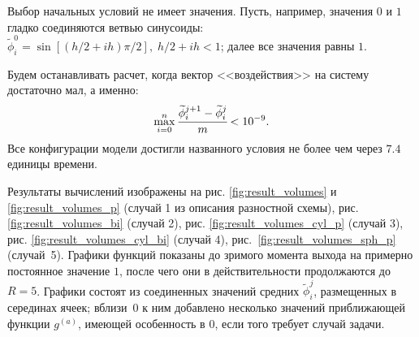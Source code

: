 Выбор начальных условий не имеет значения. Пусть, например, значения $0$ и $1$ гладко соединяются ветвью синусоиды: $\widetilde{\phi}_i^0 = \sin[(h/2 + ih) \pi / 2], \; h/2 + ih < 1$; далее все значения равны $1$.

Будем останавливать расчет, когда вектор <<воздействия>> на систему достаточно мал, а именно:
$$\max\limits_{i = 0}^n \cfrac{\widetilde{\phi}_i^{j + 1} - \widetilde{\phi}_i^j}{m} < 10^{-9} {\text{.}}$$
Все конфигурации модели достигли названного условия не более чем через $7.4$ единицы времени.

Результаты вычислений изображены на рис. \ref{fig:result_volumes} и \ref{fig:result_volumes_p} (случай 1 из описания разностной схемы), рис. \ref{fig:result_volumes_bi} (случай 2), рис. \ref{fig:result_volumes_cyl_p} (случай 3), рис. \ref{fig:result_volumes_cyl_bi} (случай 4), рис.~\ref{fig:result_volumes_sph_p} (случай~5). Графики функций показаны до зримого момента выхода на примерно постоянное значение $1$, после чего они в действительности продолжаются до $R = 5$. Графики состоят из соединенных значений средних $\widetilde{\phi}_i^j$, размещенных в серединах ячеек; вблизи~$0$ к ним добавлено несколько значений приближающей функции $g^{(a)}$, имеющей особенность в $0$, если того требует случай задачи.

